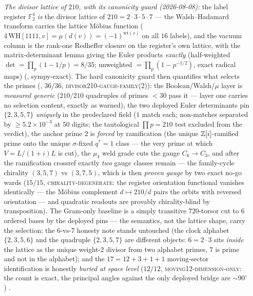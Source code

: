 \emph{The divisor lattice of $210$, with its canonicity guard
(2026-08-08):} the label register $\mathbb{F}_2^4$ \emph{is} the
divisor lattice of $210 = 2\cdot3\cdot5\cdot7$ --- the
Walsh--Hadamard transform carries the lattice M\"obius function
($4\,\mathrm{WH}[1111, v] = \mu(d(v)) = (-1)^{\mathrm{wt}(v)}$ on
all $16$ labels), and the vacuum column is the rank-one Redheffer
closure on the register's own lattice, with the
matrix-determinant lemma giving the Euler products \emph{exactly}
(half-weighted $\det = \prod_p(1 - 1/p) = 8/35$; unweighted
$= \prod_p(1 - p^{-1/2})$, exact radical maps)
(, sympy-exact).  The hard
canonicity guard then quantifies what selects the primes
(, $36/36$,
\textsc{divisor210-gauge-family(2)}): the Boolean/Walsh/$\mu$
layer is \emph{measured generic} ($210/210$ quadruples of primes
$< 30$ pass it --- layer one carries no selection content, exactly
as warned), the two deployed Euler determinants pin
$\{2,3,5,7\}$ \emph{uniquely} in the predeclared field ($1$ match
each; non-matches separated by $\ge 5.2\times10^{-3}$ at $50$
digits; the tautological $\prod p = 210$ test excluded from the
verdict), the anchor prime $2$ is \emph{forced} by ramification
(the unique $\mathbb{Z}[i]$-ramified prime onto the unique
$\sigma$-fixed $q^{*}{=}1$ class --- the very prime at which $V =
L/(1{+}i)L$ is cut), the $\mu_4$ weld grade cuts the gauge $C_6
\to C_3$, and after the ramification crossref exactly \emph{two}
gauge classes remain --- the family-cycle chirality $(3,5,7)$ vs
$(3,7,5)$, which is then \emph{proven gauge} by two exact no-go
wards ($15/15$, \textsc{chirality-degenerate}: the register
orientation functional vanishes identically --- the M\"obius
complement $d \mapsto 210/d$ pairs the orbits with reversed
orientation --- and quadratic readouts are provably
chirality-blind by transposition).  The Gram-only baseline is a
simply transitive $720$-torsor cut to $6$ ordered bases by the
deployed pins --- the semantics, not the lattice shape, carry the
selection; the $6$-vs-$7$ honesty note stands untouched (the
clock alphabet $\{2,3,5,6\}$ and the quadruple $\{2,3,5,7\}$ are
different objects: $6 = 2\cdot3$ sits \emph{inside} the lattice
as the unique weight-2 divisor from two alphabet primes, $7$ is
prime and not in the alphabet); and the $17 = 12{+}3{+}1{+}1$
moving-sector identification is honestly \emph{buried at space
level} ($12/12$, \textsc{moving12-dimension-only}: the count is
exact, the principal angles against the only deployed bridge are
${\sim}90^\circ$) \mE.

